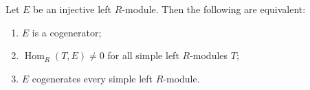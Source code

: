 Let $E$ be an injective left $R$-module. Then the following are equivalent:
\begin{enumerate}
\item[(a)] $E$ is a cogenerator;
\item[(b)] $\operatorname{Hom}_R(T, E) \neq 0$ for all simple left $R$-modules $T$;
\item[(c)] $E$ cogenerates every simple left $R$-module.
\end{enumerate}
